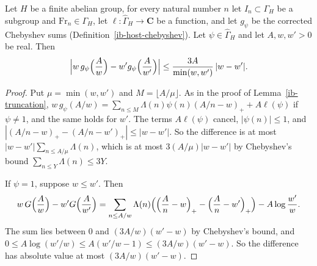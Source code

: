 \begin{lemma}\label{ib-weight-lipschitz}
Let $H$ be a finite abelian group, for every natural number $n$ let
$I_n\subset\Gamma_H$ be a subgroup and $\mathrm{Fr}_n\in\Gamma_H$, let
$\ell:\widehat\Gamma_H\to\mathbf C$ be a function, and let $g_\psi$ be the
corrected Chebyshev sums (Definition~\ref{ib-host-chebyshev}). Let
$\psi\in\widehat\Gamma_H$ and let $A,w,w'>0$ be real. Then
\[
 \Bigl|w\,g_\psi\Bigl(\frac Aw\Bigr)-w'g_\psi\Bigl(\frac A{w'}\Bigr)\Bigr|
 \leq\frac{3A}{\min(w,w')}\,|w-w'|.
\]
\end{lemma}
\begin{proof}
Put $\mu=\min(w,w')$ and $M=\lfloor A/\mu\rfloor$. As in the proof of
Lemma~\ref{ib-truncation}, $w\,g_\psi(A/w)=\sum_{n\leq M}\Lambda(n)\psi(n)(A/n-w)_+
+A\ell(\psi)$ if $\psi\neq1$, and the same holds for $w'$. The terms $A\ell(\psi)$
cancel, $|\psi(n)|\leq1$, and $|(A/n-w)_+-(A/n-w')_+|\leq|w-w'|$. So the
difference is at most $|w-w'|\sum_{n\leq A/\mu}\Lambda(n)$, which is at most
$3(A/\mu)|w-w'|$ by Chebyshev's bound $\sum_{n\leq Y}\Lambda(n)\leq3Y$.

If $\psi=1$, suppose $w\leq w'$. Then
\[
 w\,G\Bigl(\frac Aw\Bigr)-w'G\Bigl(\frac A{w'}\Bigr)
 =\sum_{n\leq A/w}\Lambda(n)\Bigl(\Bigl(\frac An-w\Bigr)_+-\Bigl(\frac An-w'\Bigr)_+\Bigr)
 -A\log\frac{w'}w.
\]
The sum lies between $0$ and $(3A/w)(w'-w)$ by Chebyshev's bound, and
$0\leq A\log(w'/w)\leq A(w'/w-1)\leq(3A/w)(w'-w)$. So the difference has
absolute value at most $(3A/w)(w'-w)$.
\end{proof}

